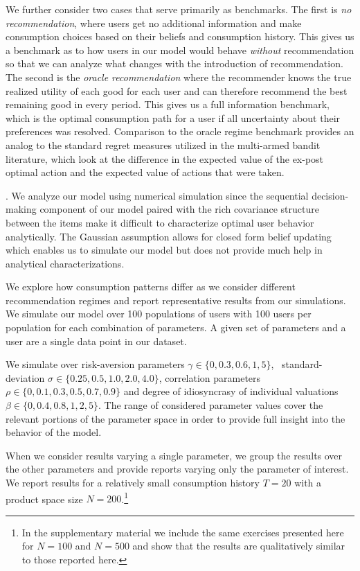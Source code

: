 \documentclass[format=acmsmall, review=false]{acmart}
\newcommand{\xhdr}[1]{\vspace{1mm} \noindent{\bf #1}}
\begin{document}
We further consider two cases that serve primarily as benchmarks. The first is \textit{no recommendation}, where users get no additional information and make consumption choices based on their beliefs and consumption history. This gives us a benchmark as to how users in our model would behave \textit{without} recommendation so that we can analyze what changes with the introduction of recommendation. The second is the \textit{oracle recommendation} where the recommender knows the true realized utility of each good for each user and can therefore recommend the best remaining good in every period. This gives us a full information benchmark, which is the optimal consumption path for a user if all uncertainty about their preferences was resolved. Comparison to the oracle regime benchmark provides an analog to the standard regret measures utilized in the multi-armed bandit literature, which look at the difference in the expected value of the ex-post optimal action and the expected value of actions that were taken.
\par

\xhdr{Simulation Details}. 
We analyze our model using numerical simulation since the sequential decision-making component of our model paired with the rich covariance structure between the items make it difficult to characterize optimal user behavior analytically. The Gaussian assumption allows for closed form belief updating which enables us to simulate our model but does not provide much help in analytical characterizations. 
\par

We explore how consumption patterns differ as we consider different recommendation regimes and report representative results from our simulations. We simulate our model over 100 populations of users with 100 users per population for each combination of parameters. 
A given set of parameters and a user are a single data point in our dataset.
\par

We simulate over risk-aversion parameters $\gamma \in \{ 0, 0.3, 0.6, 1, 5 \}$, \ standard-deviation $\sigma \in \{ 0.25, 0.5, 1.0, 2.0, 4.0 \}$, correlation parameters $\rho\in \{ 0, 0.1, 0.3, 0.5, 0.7, 0.9 \} $ and degree of idiosyncrasy of individual valuations $\beta \in \{ 0, 0.4, 0.8, 1, 2, 5\}$. The range of considered parameter values cover the relevant portions of the parameter space in order to provide full insight into the behavior of the model. 
\par
When we consider results varying a single parameter, we group the results over the other parameters and provide reports varying only the parameter of interest. We report results for a relatively small consumption history $T=20$ with a product space size $N=200$.\footnote{In the supplementary material we include the same exercises presented here for $N = 100$ and $N = 500$ and show that the results are qualitatively similar to those reported here.}
\par
\end{document}
